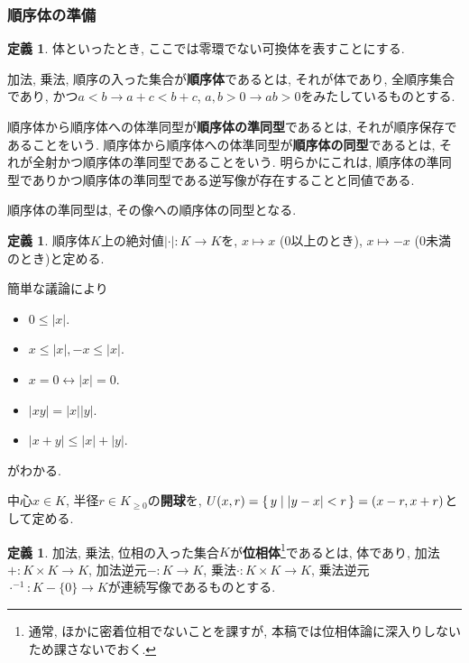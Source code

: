 \documentclass[a4paper, twoside]{bxjsarticle}
\newcommand{\abs}[1]{\left\lvert#1\right\rvert}
\theoremstyle{definition}
\newtheorem{defn}[thm]{定義}
\begin{document}
    \subsubsection{順序体の準備}
        \begin{defn}
            体といったとき, ここでは零環でない可換体を表すことにする.
        
            加法, 乗法, 順序の入った集合が\textbf{順序体}であるとは, それが体であり, 全順序集合であり, かつ$a<b\to a+c<b+c$, $a, b>0 \to ab>0$をみたしているものとする.
            
            順序体から順序体への体準同型が\textbf{順序体の準同型}であるとは, それが順序保存であることをいう. 
            順序体から順序体への体準同型が\textbf{順序体の同型}であるとは, それが全射かつ順序体の準同型であることをいう. 明らかにこれは, 順序体の準同型でありかつ順序体の準同型である逆写像が存在することと同値である.
            
            順序体の準同型は, その像への順序体の同型となる.
        \end{defn}
        \begin{defn}
            順序体$K$上の絶対値$\abs{\cdot}\colon K\to K$を, $x\mapsto x$ (0以上のとき), $x\mapsto -x$ (0未満のとき)と定める. 
            
            簡単な議論により
            \begin{itemize}
                \item $0\leq \abs{x}$.
                \item $x\leq \abs{x}, -x\leq \abs{x}$.
                \item $x=0 \leftrightarrow \abs{x}=0$.
                \item $\abs{xy}=\abs{x}\abs{y}$.
                \item $\abs{x+y}\leq\abs{x}+\abs{y}$.
            \end{itemize}
            がわかる.
            
            中心$x\in K$, 半径$r\in K_{\geq 0}$の\textbf{開球}を, $U(x, r) =\set{y|\abs{y-x}<r}=(x-r, x+r)$として定める.
        \end{defn}
        \begin{defn}
            加法, 乗法, 位相の入った集合$K$が\textbf{位相体}\footnote{通常, ほかに密着位相でないことを課すが, 本稿では位相体論に深入りしないため課さないでおく.}であるとは, 体であり, 加法$+\colon K\times K\to K$, 加法逆元$-\colon K\to K$, 乗法$\cdot\colon K\times K\to K$, 乗法逆元$\cdot^{-1}\colon K-\{0\}\to K$が連続写像であるものとする.
        \end{defn}
\end{document}
